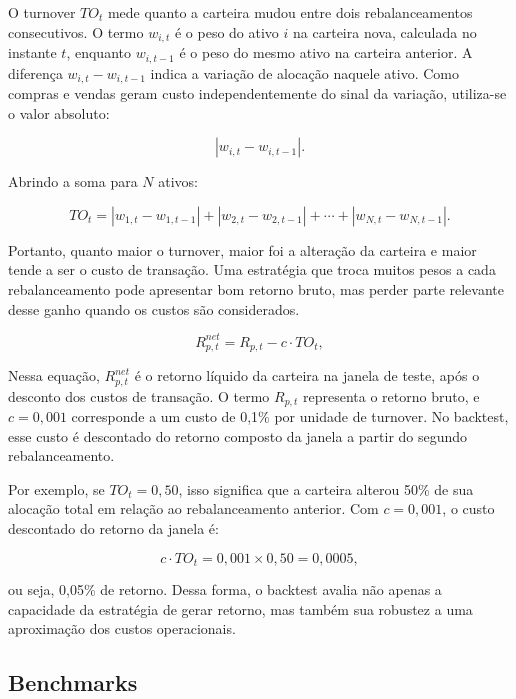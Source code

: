 \documentclass[12pt,a4paper]{article}
\begin{document}
O turnover $TO_t$ mede quanto a carteira mudou entre dois rebalanceamentos consecutivos. O termo $w_{i,t}$ é o peso do ativo $i$ na carteira nova, calculada no instante $t$, enquanto $w_{i,t-1}$ é o peso do mesmo ativo na carteira anterior. A diferença $w_{i,t}-w_{i,t-1}$ indica a variação de alocação naquele ativo. Como compras e vendas geram custo independentemente do sinal da variação, utiliza-se o valor absoluto:

\begin{equation}
|w_{i,t}-w_{i,t-1}|.
\end{equation}

Abrindo a soma para $N$ ativos:

\begin{equation}
TO_t
=
|w_{1,t}-w_{1,t-1}|
+|w_{2,t}-w_{2,t-1}|
+\cdots
+|w_{N,t}-w_{N,t-1}|.
\end{equation}

Portanto, quanto maior o turnover, maior foi a alteração da carteira e maior tende a ser o custo de transação. Uma estratégia que troca muitos pesos a cada rebalanceamento pode apresentar bom retorno bruto, mas perder parte relevante desse ganho quando os custos são considerados.

\begin{equation}
R_{p,t}^{net}
=
R_{p,t}
-
c \cdot TO_t,
\end{equation}

Nessa equação, $R_{p,t}^{net}$ é o retorno líquido da carteira na janela de teste, após o desconto dos custos de transação. O termo $R_{p,t}$ representa o retorno bruto, e $c=0{,}001$ corresponde a um custo de 0,1\% por unidade de turnover. No backtest, esse custo é descontado do retorno composto da janela a partir do segundo rebalanceamento.

Por exemplo, se $TO_t=0{,}50$, isso significa que a carteira alterou 50\% de sua alocação total em relação ao rebalanceamento anterior. Com $c=0{,}001$, o custo descontado do retorno da janela é:

\begin{equation}
c\cdot TO_t
=
0{,}001 \times 0{,}50
=
0{,}0005,
\end{equation}

ou seja, 0,05\% de retorno. Dessa forma, o backtest avalia não apenas a capacidade da estratégia de gerar retorno, mas também sua robustez a uma aproximação dos custos operacionais.

\subsection{Benchmarks}
\end{document}
